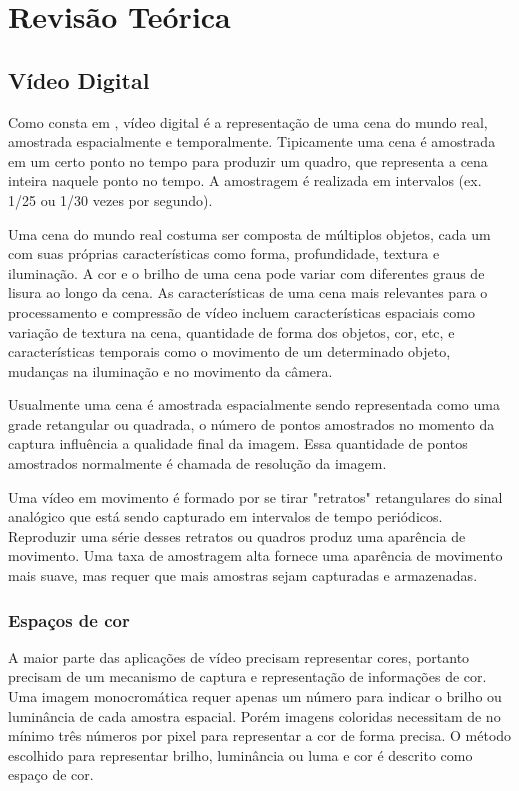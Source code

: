 \chapter{Revisão Teórica}

\section{Vídeo Digital}
Como consta em \cite{h264avcs}, vídeo digital é a representação de uma cena do mundo real, amostrada espacialmente e temporalmente. Tipicamente uma cena é amostrada em um certo ponto no tempo para produzir um quadro, que representa a cena inteira naquele ponto no tempo. A amostragem é realizada em intervalos (ex. 1/25 ou 1/30 vezes por segundo).

Uma cena do mundo real costuma ser composta de múltiplos objetos, cada um com suas próprias características como forma, profundidade, textura e iluminação. A cor e o brilho de uma cena pode variar com diferentes graus de lisura ao longo da cena. As características de uma cena mais relevantes para o processamento e compressão de vídeo incluem características espaciais como variação de textura na cena, quantidade de forma dos objetos, cor, etc, e características temporais como o movimento de um determinado objeto, mudanças na iluminação e no movimento da câmera.

Usualmente uma cena é amostrada espacialmente sendo representada como uma grade retangular ou quadrada, o número de pontos amostrados no momento da captura influência a qualidade final da imagem. Essa quantidade de pontos amostrados normalmente é chamada de resolução da imagem. 

Uma vídeo em movimento é formado por se tirar "retratos" retangulares do sinal analógico que está sendo capturado em intervalos de tempo periódicos. Reproduzir uma série desses retratos ou quadros produz uma aparência de movimento. Uma taxa de amostragem alta fornece uma aparência de movimento mais suave, mas requer que mais amostras sejam capturadas e armazenadas.


\subsection{Espaços de cor}

A maior parte das aplicações de vídeo precisam representar cores, portanto precisam de um mecanismo de captura e representação de informações de cor. Uma imagem monocromática requer apenas um número para indicar o brilho ou luminância de cada amostra espacial. Porém imagens coloridas necessitam de no mínimo três números por pixel para representar a cor de forma precisa. O método escolhido para representar brilho, luminância ou luma e cor é descrito como espaço de cor.

